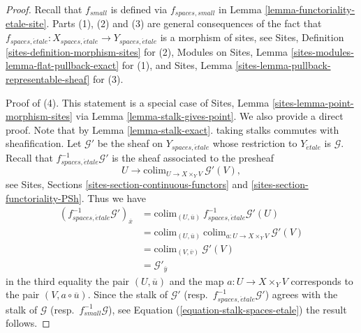 \begin{proof}
Recall that $f_{small}$ is defined via $f_{spaces, small}$ in
Lemma \ref{lemma-functoriality-etale-site}.
Parts (1), (2) and (3) are general consequences of the fact that
$f_{spaces, \acute{e}tale} :
X_{spaces, \acute{e}tale}
\to
Y_{spaces, \acute{e}tale}$
is a morphism of sites, see
Sites, Definition \ref{sites-definition-morphism-sites}
for (2),
Modules on Sites, Lemma \ref{sites-modules-lemma-flat-pullback-exact}
for (1), and
Sites, Lemma \ref{sites-lemma-pullback-representable-sheaf}
for (3).

\medskip\noindent
Proof of (4). This statement is a special case of
Sites, Lemma \ref{sites-lemma-point-morphism-sites}
via
Lemma \ref{lemma-stalk-gives-point}.
We also provide a direct proof. Note that by
Lemma \ref{lemma-stalk-exact}.
taking stalks commutes with sheafification.
Let $\mathcal{G}'$ be the sheaf on $Y_{spaces, \acute{e}tale}$ whose restriction
to $Y_{\acute{e}tale}$ is $\mathcal{G}$.
Recall that $f_{spaces, \acute{e}tale}^{-1}\mathcal{G}'$ is the sheaf
associated to the presheaf
$$
U \longrightarrow \text{colim}_{U \to X \times_Y V}\ \mathcal{G}'(V),
$$
see
Sites, Sections \ref{sites-section-continuous-functors} and
\ref{sites-section-functoriality-PSh}.
Thus we have
\begin{align*}
(f_{spaces, \acute{e}tale}^{-1}\mathcal{G}')_{\overline{x}}
& =
\text{colim}_{(U, \overline{u})}\ f_{spaces, \acute{e}tale}^{-1}\mathcal{G}'(U)
\\
& = \text{colim}_{(U, \overline{u})}
\ \text{colim}_{a : U \to X \times_Y V}\ \mathcal{G}'(V) \\
& = \text{colim}_{(V, \overline{v})}\ \mathcal{G}'(V) \\
& = \mathcal{G}'_{\overline{y}}
\end{align*}
in the third equality the pair $(U, \overline{u})$ and the map
$a : U \to X \times_Y V$ corresponds to the pair $(V, a \circ \overline{u})$.
Since the stalk of $\mathcal{G}'$
(resp.\ $f_{spaces, \acute{e}tale}^{-1}\mathcal{G}'$)
agrees with the stalk of $\mathcal{G}$ (resp.\ $f_{small}^{-1}\mathcal{G}$),
see
Equation (\ref{equation-stalk-spaces-etale})
the result follows.
\end{proof}

